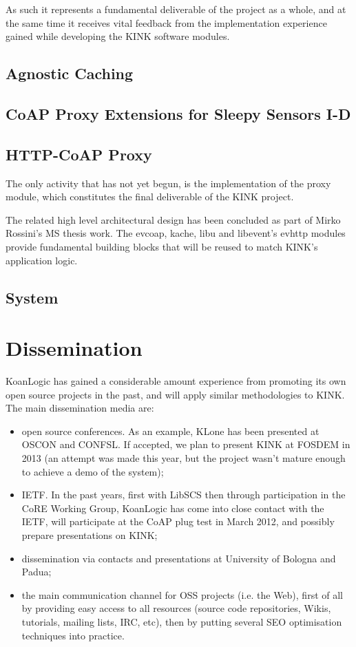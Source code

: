 \documentclass[12pt]{article}
\begin{document}
As such it represents a fundamental deliverable of the project as a whole, and at the same time it receives vital feedback from the implementation experience gained while developing the KINK software modules.

\subsection{Agnostic Caching}


\subsection{CoAP Proxy Extensions for Sleepy Sensors I-D}


\subsection{HTTP-CoAP Proxy}
The only activity that has not yet begun, is the implementation of the proxy module, which constitutes the final deliverable of the KINK project. 

The related high level architectural design has been concluded as part of Mirko Rossini's MS thesis work.  The evcoap, kache, libu and libevent's evhttp modules provide fundamental building blocks that will be reused to match KINK's application logic.

\subsection{System}


\section{Dissemination}
KoanLogic has gained a considerable amount experience from promoting its own open source projects in the past, and will apply similar methodologies to KINK. The main dissemination media are:
\begin{itemize}
\item open source conferences. As an example, KLone has been presented at OSCON and CONFSL. If accepted, we plan to present KINK at FOSDEM in 2013 (an attempt was made this year, but the project wasn't mature enough to achieve a demo of the system);
\item IETF. In the past years, first with LibSCS then through participation in the CoRE Working Group, KoanLogic has come into close contact with the IETF, will participate at the CoAP plug test in March 2012, and possibly prepare presentations on KINK;
\item dissemination via contacts and presentations at University of Bologna and Padua;
\item the main communication channel for OSS projects (i.e. the Web), first of all by providing easy access to all resources (source code repositories, Wikis, tutorials, mailing lists, IRC, etc), then by putting several SEO optimisation techniques into practice.
\end{itemize}
\end{document}
